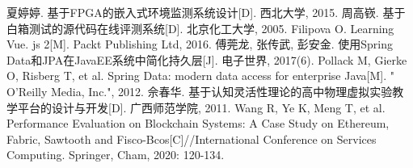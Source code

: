 \begin{thebibliography}{99}
夏婷婷. 基于FPGA的嵌入式环境监测系统设计[D]. 西北大学, 2015.
周高嵚. 基于白箱测试的源代码在线评测系统[D]. 北京化工大学, 2005.
Filipova O. Learning Vue. js 2[M]. Packt Publishing Ltd, 2016.
傅莞龙, 张传武, 彭安金. 使用Spring Data和JPA在JavaEE系统中简化持久层[J]. 电子世界, 2017(6).
Pollack M, Gierke O, Risberg T, et al. Spring Data: modern data access for enterprise Java[M]. " O'Reilly Media, Inc.", 2012.
佘春华. 基于认知灵活性理论的高中物理虚拟实验教学平台的设计与开发[D]. 广西师范学院, 2011.
Wang R, Ye K, Meng T, et al. Performance Evaluation on Blockchain Systems: A Case Study on Ethereum, Fabric, Sawtooth and Fisco-Bcos[C]//International Conference on Services Computing. Springer, Cham, 2020: 120-134.

\end{thebibliography}

\endgroup
\clearpage
